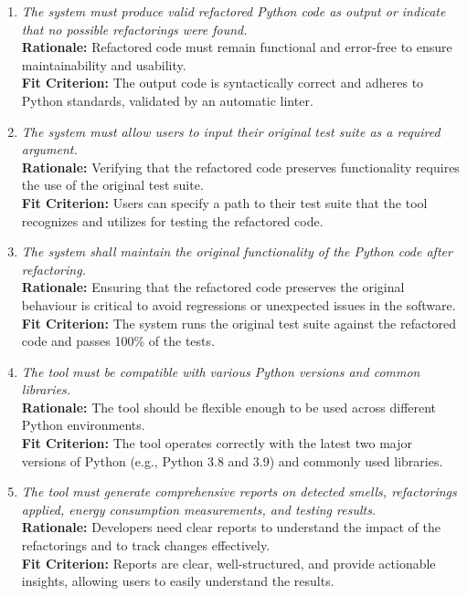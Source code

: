 \documentclass[12pt]{article}
\begin{document}
\begin{enumerate}[label=FR \arabic*., wide=0pt, leftmargin=*]
    {\bf Fit Criterion:} The algorithm evaluates multiple refactoring options and selects the one that results in the lowest energy consumption for the given code smell.
    \item \emph{The system must produce valid refactored Python code as output or indicate that no possible refactorings were found.}\\
    {\bf Rationale:} Refactored code must remain functional and error-free to ensure maintainability and usability.\\
    {\bf Fit Criterion:} The output code is syntactically correct and adheres to Python standards, validated by an automatic linter.
    \item \emph{The system must allow users to input their original test suite as a required argument.}\\
    {\bf Rationale:} Verifying that the refactored code preserves functionality requires the use of the original test suite.\\
    {\bf Fit Criterion:} Users can specify a path to their test suite that the tool recognizes and utilizes for testing the refactored code.
    \item \emph{The system shall maintain the original functionality of the Python code after refactoring.}\\
    {\bf Rationale:} Ensuring that the refactored code preserves the original behaviour is critical to avoid regressions or unexpected issues in the software.\\
    {\bf Fit Criterion:} The system runs the original test suite against the refactored code and passes 100\% of the tests.
    \item \emph{The tool must be compatible with various Python versions and common libraries.}\\
    {\bf Rationale:} The tool should be flexible enough to be used across different Python environments.\\
    {\bf Fit Criterion:} The tool operates correctly with the latest two major versions of Python (e.g., Python 3.8 and 3.9) and commonly used libraries.
    \item \emph{The tool must generate comprehensive reports on detected smells, refactorings applied, energy consumption measurements, and testing results.}\\
    {\bf Rationale:} Developers need clear reports to understand the impact of the refactorings and to track changes effectively.\\
    {\bf Fit Criterion:} Reports are clear, well-structured, and provide actionable insights, allowing users to easily understand the results.

\end{enumerate}
\end{document}
